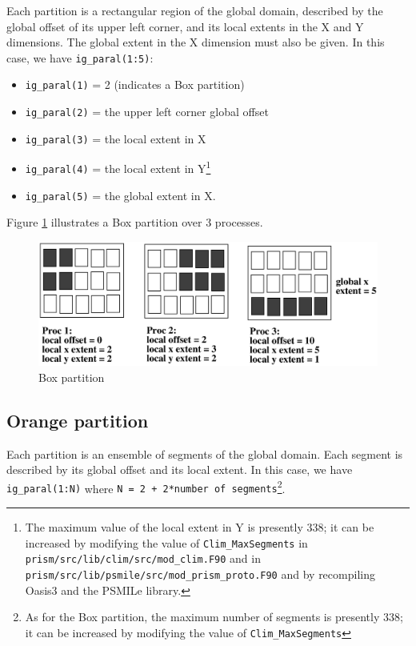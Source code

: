Each partition is a rectangular region of the global domain, described
by the global offset of its upper left corner, and its local extents in the
X and Y dimensions. The global extent in the X dimension must also be
given. In this case, we have {\tt ig\_paral(1:5)}:
\begin{itemize}
 \item {\tt ig\_paral(1)} = 2 (indicates a Box partition)
 \item {\tt ig\_paral(2)} = the upper left corner global offset
 \item {\tt ig\_paral(3)} = the local extent in X
 \item {\tt ig\_paral(4)} = the local extent in Y\footnote{The maximum
value of the local extent in Y is presently 338; it can be increased
by modifying the value of {\tt Clim\_MaxSegments} in {\tt
prism/src/lib/clim/src/mod\_clim.F90} and in {\tt
prism/src/lib/psmile/src/mod\_prism\_proto.F90} and by recompiling
Oasis3 and the PSMILe library.}
 \item {\tt ig\_paral(5)} = the global extent in X.
\end{itemize}

Figure \ref{box_partition} illustrates a Box partition over 3
processes.  
 
\begin{figure}
\includegraphics[scale=.6]{box_new.eps} 
\caption{Box partition}
\label{box_partition}
\end{figure} 
  
\subsection{Orange partition}

Each partition is an ensemble of segments of the global domain. Each
segment is described by its global offset and its local extent.  In
this case, we have {\tt ig\_paral(1:N)} where {\tt N = 2 + 2*number of
segments}\footnote{As for the Box partition, the maximum number of
segments is presently 338; it can be increased by modifying the value
of {\tt Clim\_MaxSegments}}.

